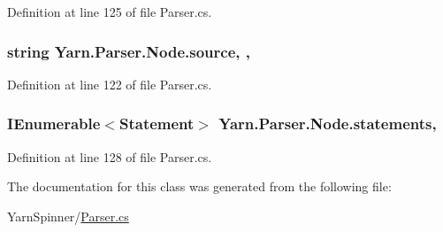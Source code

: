 Definition at line 125 of file Parser.\-cs.

\hypertarget{a00140_a005a6b0f614beb77708fc5ce8fea66e1}{
\subsubsection[{source}]{\setlength{\rightskip}{0pt plus 5cm}string Yarn.\-Parser.\-Node.\-source\hspace{0.3cm}{\ttfamily [get]}, {\ttfamily [set]}, {\ttfamily [package]}}}\label{a00140_a005a6b0f614beb77708fc5ce8fea66e1}


Definition at line 122 of file Parser.\-cs.

\hypertarget{a00140_abdae3fb1c6927b38ce29b1b71a00cb12}{
\subsubsection[{statements}]{\setlength{\rightskip}{0pt plus 5cm}I\-Enumerable$<${\bf Statement}$>$ Yarn.\-Parser.\-Node.\-statements\hspace{0.3cm}{\ttfamily [get]}, {\ttfamily [package]}}}\label{a00140_abdae3fb1c6927b38ce29b1b71a00cb12}


Definition at line 128 of file Parser.\-cs.



The documentation for this class was generated from the following file\-:\begin{DoxyCompactItemize}
\item 
Yarn\-Spinner/\hyperlink{a00316}{Parser.\-cs}\end{DoxyCompactItemize}
